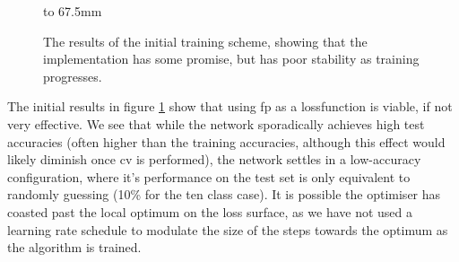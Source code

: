 \begin{figure}[p]
    \hbox to 67.5mm{}%
    \caption[The results of the initial training scheme.]{The results of the initial training scheme, showing that the implementation has some promise, but has poor stability as training progresses.}
    \label{fig:training_scheme_1}
\end{figure}

The initial results in figure \ref{fig:training_scheme_1} show that using \gls{fp} as a \gls{lossfunction} is viable, if not very effective. We see that while the network sporadically achieves high test accuracies (often higher than the training accuracies, although this effect would likely diminish once \gls{cv} is performed), the network settles in a low-accuracy configuration, where it's performance on the test set is only equivalent to randomly guessing (10\% for the ten class case). It is possible the optimiser has coasted past the local optimum on the loss surface, as we have not used a learning rate schedule to modulate the size of the steps towards the optimum as the algorithm is trained.
\bigskip

